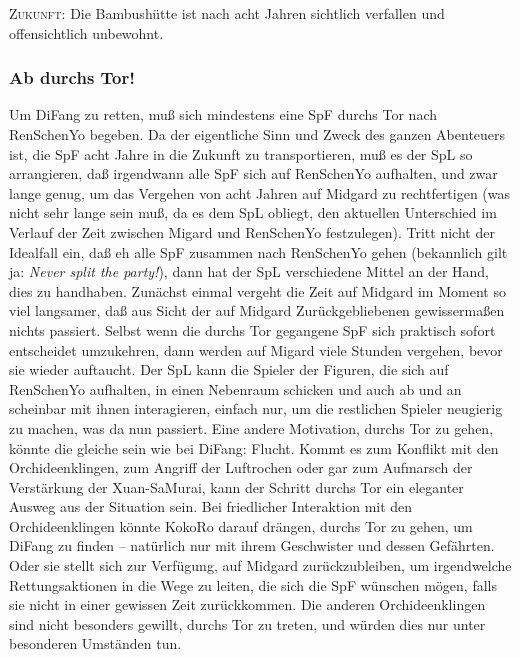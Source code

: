 \documentclass[
a4paper,
twoside,
DIV=calc,
BCOR=4mm,
fontsize=9pt,
twocolumn=on,
titlepage=on,
parskip=half
]{scrartcl}
\begin{document}
\textsc{Zukunft:} Die Bambushütte ist nach acht Jahren sichtlich
verfallen und offensichtlich unbewohnt.

\subsubsection{Ab durchs Tor!}

Um DiFang zu retten, muß sich mindestens eine SpF durchs Tor nach
RenSchenYo begeben. Da der eigentliche Sinn und Zweck des ganzen
Abenteuers ist, die SpF acht Jahre in die Zukunft zu transportieren,
muß es der SpL so arrangieren, daß irgendwann alle SpF sich auf
RenSchenYo aufhalten, und zwar lange genug, um das Vergehen von acht
Jahren auf Midgard zu rechtfertigen (was nicht sehr lange sein muß, da
es dem SpL obliegt, den aktuellen Unterschied im Verlauf der Zeit
zwischen Migard und RenSchenYo festzulegen). Tritt nicht der Idealfall
ein, daß eh alle SpF zusammen nach RenSchenYo gehen (bekannlich gilt
ja: \emph{Never split the party!}), dann hat der SpL verschiedene
Mittel an der Hand, dies zu handhaben. Zunächst einmal vergeht die
Zeit auf Midgard im Moment so viel langsamer, daß aus Sicht der auf
Midgard Zurückgebliebenen gewissermaßen nichts passiert. Selbst wenn
die durchs Tor gegangene SpF sich praktisch sofort entscheidet
umzukehren, dann werden auf Migard viele Stunden vergehen, bevor sie
wieder auftaucht. Der SpL kann die Spieler der Figuren, die sich auf
RenSchenYo aufhalten, in einen Nebenraum schicken und auch ab und an
scheinbar mit ihnen interagieren, einfach nur, um die restlichen
Spieler neugierig zu machen, was da nun passiert. Eine andere
Motivation, durchs Tor zu gehen, könnte die gleiche sein wie bei
DiFang: Flucht. Kommt es zum Konflikt mit den Orchideenklingen, zum
Angriff der Luftrochen oder gar zum Aufmarsch der Verstärkung der
Xuan-SaMurai, kann der Schritt durchs Tor ein eleganter Ausweg aus der
Situation sein. Bei friedlicher Interaktion mit den Orchideenklingen
könnte KokoRo darauf drängen, durchs Tor zu gehen, um DiFang zu finden
-- natürlich nur mit ihrem Geschwister und dessen Gefährten. Oder sie
stellt sich zur Verfügung, auf Midgard zurückzubleiben, um
irgendwelche Rettungsaktionen in die Wege zu leiten, die sich die SpF
wünschen mögen, falls sie nicht in einer gewissen Zeit
zurückkommen. Die anderen Orchideenklingen sind nicht besonders
gewillt, durchs Tor zu treten, und würden dies nur unter besonderen
Umständen tun.
\end{document}
